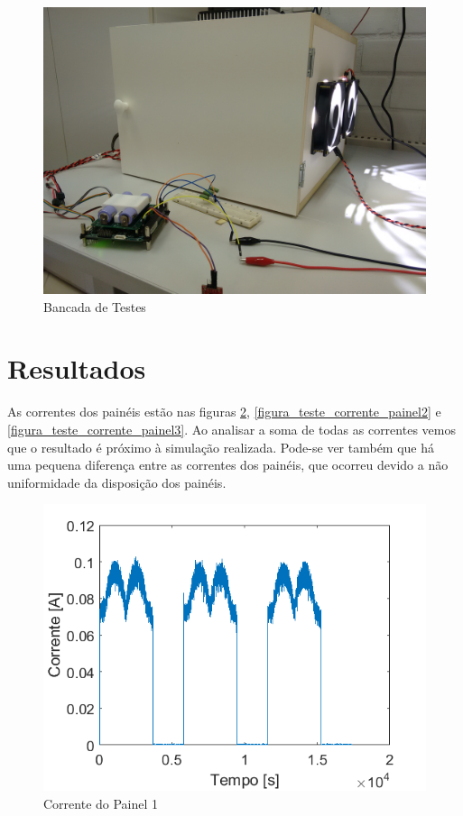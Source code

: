 \begin{figure}[!htpb]
\begin{center}
\includegraphics[scale=0.05]{figures/bancada.jpg}
\caption{Bancada de Testes}
\label{figura_bancada_teste}
\end{center}
\end{figure}

\section{Resultados}

As correntes dos painéis estão nas figuras \ref{figura_teste_corrente_painel1}, \ref{figura_teste_corrente_painel2} e \ref{figura_teste_corrente_painel3}. Ao analisar a soma de todas as correntes vemos que o resultado é próximo à simulação realizada. Pode-se ver também que há uma pequena diferença entre as correntes dos painéis, que ocorreu devido a não uniformidade da disposição dos painéis.

\begin{figure}[!htpb]
\begin{center}
\includegraphics[scale=0.5]{figures/testPanel1Current.png}
\caption{Corrente do Painel 1}
\label{figura_teste_corrente_painel1}
\end{center}
\end{figure}

